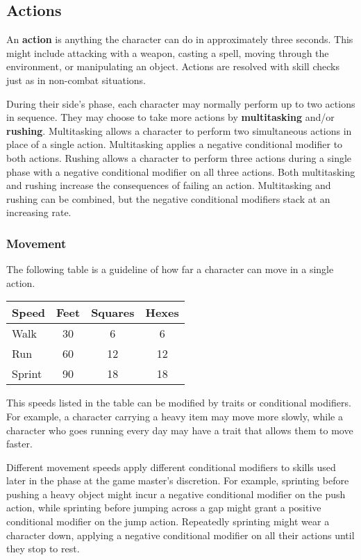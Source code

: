 \documentclass[11pt]{article}
\begin{document}
\subsection{Actions}
An \textbf{action} is anything the character can do in approximately three seconds.
This might include attacking with a weapon, casting a spell, moving through the environment, or manipulating an object.
Actions are resolved with skill checks just as in non-combat situations.

During their side's phase, each character may normally perform up to two actions in sequence.
They may choose to take more actions by \textbf{multitasking} and/or \textbf{rushing}.
Multitasking allows a character to perform two simultaneous actions in place of a single action.
Multitasking applies a negative conditional modifier to both actions.
Rushing allows a character to perform three actions during a single phase with a negative conditional modifier on all three actions.
Both multitasking and rushing increase the consequences of failing an action.
Multitasking and rushing can be combined, but the negative conditional modifiers stack at an increasing rate.

\subsubsection{Movement}
The following table is a guideline of how far a character can move in a single action.

\begin{center}
	\begin{tabular}{lccc}
		Speed  & Feet & Squares & Hexes \\
		\hline
		Walk   & 30   & 6       & 6     \\
		Run    & 60   & 12      & 12    \\
		Sprint & 90   & 18      & 18    \\
	\end{tabular}
\end{center}

This speeds listed in the table can be modified by traits or conditional modifiers.
For example, a character carrying a heavy item may move more slowly, while a character who goes running every day may have a trait that allows them to move faster.

Different movement speeds apply different conditional modifiers to skills used later in the phase at the game master's discretion.
For example, sprinting before pushing a heavy object might incur a negative conditional modifier on the push action, while sprinting before jumping across a gap might grant a positive conditional modifier on the jump action.
Repeatedly sprinting might wear a character down, applying a negative conditional modifier on all their actions until they stop to rest.
\end{document}
